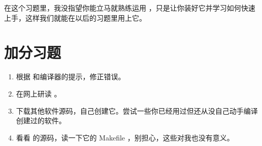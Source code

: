 在这个习题里，我没指望你能立马就熟练运用  ，只是让你装好它并学习如何快速上手，这样我们就能在以后的习题里用上它。

\section{加分习题}

\begin{enumerate}
\item 根据  和编译器的提示，修正错误。
\item 在网上研读  。
\item 下载其他软件源码，自己创建它。尝试一些你已经用过但还从没自己动手编译创建过的软件。
\item 看看  的源码，读一下它的 Makefile ，别担心，这些对我也没有意义。
\end{enumerate}

